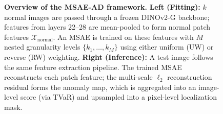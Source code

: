 \begin{figure}[t]
  \caption{\textbf{Overview of the MSAE-AD framework.}
  \textbf{Left (Fitting):} $k$ normal images are passed through a frozen DINOv2-G backbone; features from layers 22--28 are mean-pooled to form normal patch features $\mathcal{X}_{\text{normal}}$.
  An MSAE is trained on these features with $M$ nested granularity levels $\{k_1,\ldots,k_M\}$ using either uniform (UW) or reverse (RW) weighting.
  \textbf{Right (Inference):} A test image follows the same feature extraction pipeline. The trained MSAE reconstructs each patch feature; the multi-scale $\ell_2$ reconstruction residual forms the anomaly map, which is aggregated into an image-level score (via TVaR) and upsampled into a pixel-level localization mask.}
  \label{fig:framework}
\end{figure}
